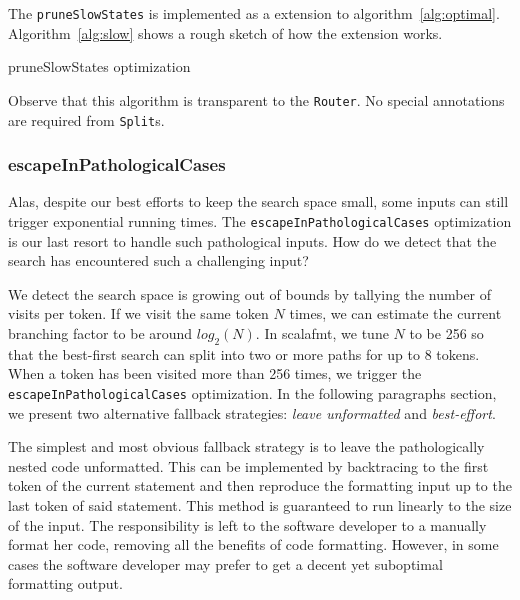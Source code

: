 The \texttt{pruneSlowStates} is implemented as a extension to algorithm~\ref{alg:optimal}.
Algorithm~\ref{alg:slow} shows a rough sketch of how the extension works.
\begin{algorithm}[H]
  \caption{pruneSlowStates optimization}\label{alg:slow}
  
\end{algorithm}
Observe that this algorithm is transparent to the \texttt{Router}.
No special annotations are required from \texttt{Split}s.

\subsubsection{escapeInPathologicalCases}\label{sec:escape}
Alas, despite our best efforts to keep the search space small, some inputs can still trigger exponential running times.
The \texttt{escapeInPathologicalCases} optimization is our last resort to handle such pathological inputs.
How do we detect that the search has encountered such a challenging input?

We detect the search space is growing out of bounds by tallying the number of visits per token.
If we visit the same token $N$ times, we can estimate the current branching factor to be around $log_2(N)$.
In scalafmt, we tune $N$ to be 256 so that the best-first search can split into two or more paths for up to 8 tokens.
When a token has been visited more than 256 times, we trigger the \texttt{escapeInPathologicalCases} optimization.
In the following paragraphs section, we present two alternative fallback strategies: \emph{leave unformatted} and \emph{best-effort}.

The simplest and most obvious fallback strategy is to leave the pathologically nested code unformatted.
This can be implemented by backtracing to the first token of the current statement and then reproduce the formatting input up to the last token of said statement.
This method is guaranteed to run linearly to the size of the input.
The responsibility is left to the software developer to a manually format her code, removing all the benefits of code formatting.
However, in some cases the software developer may prefer to get a decent yet suboptimal formatting output.

